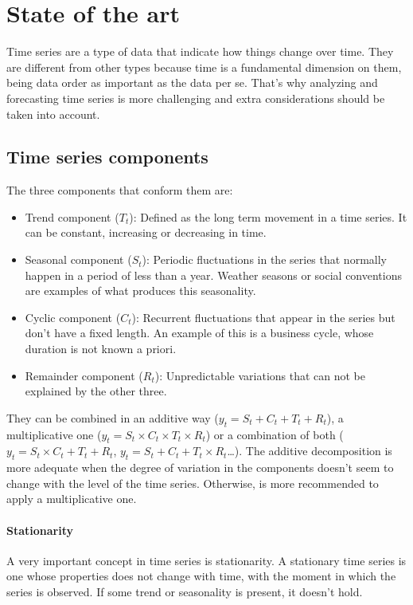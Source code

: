 \chapter{State of the art}
\label{ch:state-of-the-art}
Time series are a type of data that indicate how things change over time. They are different from other types because time is a fundamental dimension on them, being data order as important as the data per se. That's why analyzing and forecasting time series is more challenging and extra considerations should be taken into account. \cite{lazzeri2020machine}

\section{Time series components}
The three components that conform them are:
\begin{itemize}
    \item Trend component ($T_t$): Defined as the long term movement in a time series. It can be constant, increasing or decreasing in time.
    \item Seasonal component ($S_t$): Periodic fluctuations in the series that normally happen in a period of less than a year. Weather seasons or social conventions are examples of what produces this seasonality.
    \item Cyclic component ($C_t$): Recurrent fluctuations that appear in the series but don't have a fixed length. An example of this is a business cycle, whose duration is not known a priori.
    \item Remainder component ($R_t$): Unpredictable variations that can not be explained by the other three.
\end{itemize}

They can be combined in an additive way ($y_t = S_t + C_t + T_t + R_t$), a multiplicative one ($y_t = S_t \times C_t \times T_t \times R_t$) or a combination of both ($y_t = S_t \times C_t + T_t + R_t$, $y_t = S_t + C_t + T_t \times R_t$\ldots). The additive decomposition is more adequate when the degree of variation in the components doesn't seem to change with the level of the time series. Otherwise, is more recommended to apply a multiplicative one.  \cite{hyndman2018forecasting,lazzeri2020machine}

\subsubsection{Stationarity}
A very important concept in time series is stationarity.
A stationary time series is one whose properties does not change with time, with the moment in which the series is observed. If some trend or seasonality is present, it doesn't hold.

